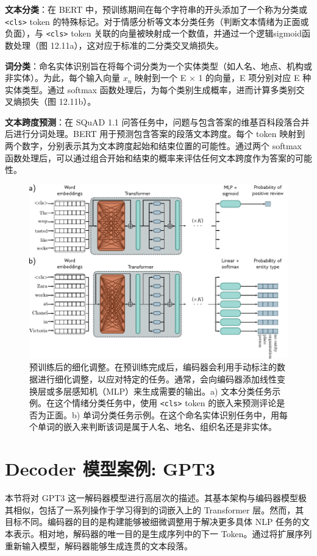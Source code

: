 \documentclass[lang=cn,newtx,10pt,scheme=chinese]{elegantbook}
\begin{document}
\textbf{文本分类}：在 BERT 中，预训练期间在每个字符串的开头添加了一个称为分类或 \texttt{\textless cls\textgreater} token 的特殊标记。对于情感分析等文本分类任务（判断文本情绪为正面或负面），与 \texttt{\textless cls\textgreater} token 关联的向量被映射成一个数值，并通过一个逻辑sigmoid函数处理（图 12.11a），这对应于标准的二分类交叉熵损失。

\textbf{词分类}：命名实体识别旨在将每个词分类为一个实体类型（如人名、地点、机构或非实体）。为此，每个输入向量 \(x_n\) 映射到一个 E × 1 的向量，E 项分别对应 E 种实体类型。通过 softmax 函数处理后，为每个类别生成概率，进而计算多类别交叉熵损失（图 12.11b）。

\textbf{文本跨度预测}：在 SQuAD 1.1 问答任务中，问题与包含答案的维基百科段落合并后进行分词处理。BERT 用于预测包含答案的段落文本跨度。每个 token 映射到两个数字，分别表示其为文本跨度起始和结束位置的可能性。通过两个 softmax 函数处理后，可以通过组合开始和结束的概率来评估任何文本跨度作为答案的可能性。

\begin{figure}[ht!]
\centering
\includegraphics[width=0.7\linewidth]{PDFFigures/UDLChap12PDF/TransformerEncoderFineTune.pdf}
\caption{预训练后的细化调整。在预训练完成后，编码器会利用手动标注的数据进行细化调整，以应对特定的任务。通常，会向编码器添加线性变换层或多层感知机（MLP）来生成需要的输出。a) 文本分类任务示例。在这个情绪分类任务中，使用 \texttt{\textless cls\textgreater} token 的嵌入来预测评论是否为正面。b) 单词分类任务示例。在这个命名实体识别任务中，用每个单词的嵌入来判断该词是属于人名、地名、组织名还是非实体。}
\end{figure}

\section{Decoder 模型案例: GPT3}
本节将对 GPT3 这一解码器模型进行高层次的描述。其基本架构与编码器模型极其相似，包括了一系列操作于学习得到的词嵌入上的 Transformer 层。然而，其目标不同。编码器的目的是构建能够被细微调整用于解决更多具体 NLP 任务的文本表示。相对地，解码器的唯一目的是生成序列中的下一 Token。通过将扩展序列重新输入模型，解码器能够生成连贯的文本段落。
\end{document}
